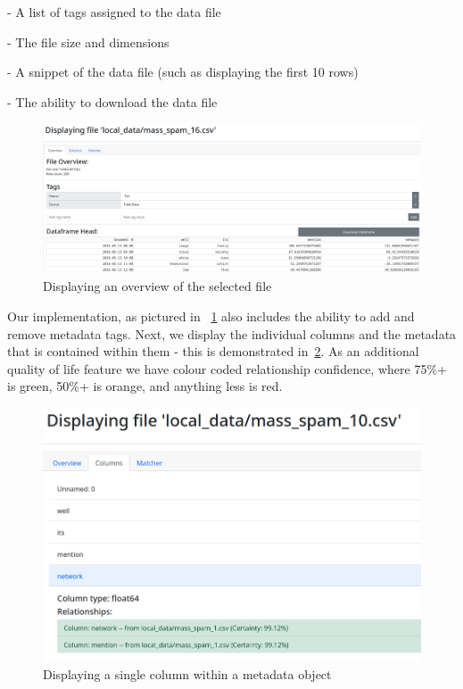 - A list of tags assigned to the data file

- The file size and dimensions

- A snippet of the data file (such as displaying the first 10 rows)

- The ability to download the data file

\begin{figure}[H]
    \centering
    \includegraphics[width=12cm]{figures/website_images/catalogue_page_file_overview}
    \caption{Displaying an overview of the selected file}
    \label{fig:catalogue_file_overview}
\end{figure}

Our implementation, as pictured in ~\ref{fig:catalogue_file_overview} also includes the ability to add and remove
metadata tags.
Next, we display the individual columns and the metadata that is contained within them - this is demonstrated
in~\ref{fig:interface_column_values}.
As an additional quality of life feature we have colour coded relationship confidence, where 75\%+ is green, 50\%+ is
orange, and anything less is red.

\begin{figure}[H]
    \centering
    \includegraphics[width=12cm]{figures/website_images/interface_column_view}
    \caption{Displaying a single column within a metadata object}
    \label{fig:interface_column_values}
\end{figure}

